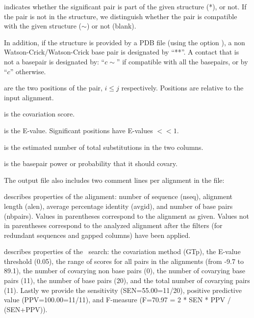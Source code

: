 \begin{sreitems}{}
 \item[\prog{First column}] indicates whether the significant pair is
   part of the given structure (*), or not.  If the pair is not in the
   structure, we distinguish whether the pair is compatible with the
   given structure ($\sim$) or not (blank).

  In addition, if the structure is provided by a PDB file (using the
  option ), a non Watson-Crick/Watson-Crick base pair
  is designated by ``**''. A contact that is not a basepair is
  designated by: ``$c\sim$'' if compatible with all the basepairs, or
  by ``$c$'' otherwise.

 \item[\prog{Second and third columns}] are the two positions of the
   pair, $i\leq j$ respectively. Positions are relative to the input
   alignment.

 \item[\prog{Fourth column}] is the covariation score.

 \item[\prog{Fifth column}] is the E-value. Significant positions
   have E-values $<< 1$.

 \item[\prog{Sixth column}] is the estimated number of total substitutions in the two columns.
 
 \item[\prog{Seventh column}] is the basepair power or probability that it should covary.
 
 \end{sreitems}
 The output file also includes two comment lines per alignment in the
 file:

 \begin{sreitems}{} \item[\prog{First
 comment line}]describes properties of the alignment: number of
 sequence (nseq), alignment length (alen), average percentage identity
 (avgid), and number of base pairs (nbpairs).  Values in parentheses
 correspond to the alignment as given. Values not in parentheses
 correspond to the analyzed alignment after the filters (for redundant
 sequences and gapped columns) have been applied.

 \item[\prog{Second comment line}]describes properties of the \rscape\
   search: the covariation method (GTp), the E-value threshold (0.05),
   the range of scores for all pairs in the alignments (from -9.7 to
   89.1), the number of covarying non base pairs (0), the number of
   covarying base pairs (11), the number of base pairs (20), and the
   total number of covarying pairs (11). Lastly we provide the
   sensitivity (SEN=55.00=11/20), positive predictive value
   (PPV=100.00=11/11), and F-measure (F=70.97 = 2 * SEN * PPV /
   (SEN+PPV)).  \end{sreitems}


